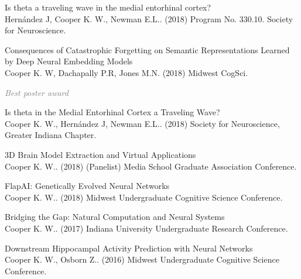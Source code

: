 \documentclass[10pt]{cooperCV2}
\begin{document}
\begin{etaremune}[itemindent=-1.5\bibhang, topsep=0pt,
				   itemsep=\bibsep,partopsep=0pt,parsep=0pt,leftmargin={\bibhang+\widthof{[999]}}]
	
    \item Is theta a traveling wave in the medial entorhinal cortex?\\ Hernández J, Cooper K. W., Newman E.L.. (2018) Program No. 330.10. Society for Neuroscience. 
     
	
    \item Consequences of Catastrophic Forgetting on Semantic Representations Learned by Deep Neural Embedding Models\\ Cooper K. W, Dachapally P.R, Jones M.N. (2018) Midwest CogSci. 
     
     	\begin{innerlist}
     	
	     \item  \textcolor{grey}{\textit{Best poster award} }
     	
     	\end{innerlist}
     
	
    \item Is theta in the Medial Entorhinal Cortex a Traveling Wave?\\ Cooper K. W., Hernández J, Newman E.L.. (2018) Society for Neuroscience, Greater Indiana Chapter. 
     
	
    \item 3D Brain Model Extraction and Virtual Applications\\ Cooper K. W.. (2018) (Panelist) Media School Graduate Association Conference. 
     
	
    \item FlapAI: Genetically Evolved Neural Networks\\ Cooper K. W.. (2018) Midwest Undergraduate Cognitive Science Conference. 
     
	
    \item Bridging the Gap: Natural Computation and Neural Systems\\ Cooper K. W.. (2017) Indiana University Undergraduate Research Conference. 
     
	
    \item Downstream Hippocampal Activity Prediction with Neural Networks\\ Cooper K. W., Osborn Z.. (2016) Midwest Undergraduate Cognitive Science Conference. 
     
	


\end{etaremune}
\end{document}
